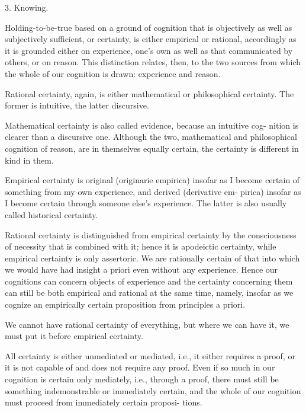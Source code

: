     3. Knowing.

    Holding-to-be-true based on a ground of cognition that is
    objectively as well as subjectively sufficient, or certainty, is
    either empirical or rational, accordingly as it is grounded either
    on experience, one's own as well as that communicated by others, or on reason.
    This distinction relates, then, to the two sources from which
    the whole of our cognition is drawn: experience and reason.

    Rational certainty, again, is either
    mathematical or philosophical certainty.
    The former is intuitive, the latter discursive.

    Mathematical certainty is also called evidence, because an intuitive cog-
    nition is clearer than a discursive one. Although the two, mathematical
    and philosophical cognition of reason, are in themselves equally certain,
    the certainty is different in kind in them.

    Empirical certainty is original (originarie empirica) insofar as I become
    certain of something from my own experience, and derived (derivative em-
    pirica) insofar as I become certain through someone else's experience. The
    latter is also usually called historical certainty.

    Rational certainty is distinguished from empirical certainty
    by the consciousness of necessity that is combined with it;
    hence it is apodeictic certainty,
    while empirical certainty is only assertoric.
    We are rationally certain of that
    into which we would have had insight a priori
    even without any experience.
    Hence our cognitions can concern objects of experience
    and the certainty concerning them can still be
    both empirical and rational at the same time, namely,
    insofar as we cognize an empirically certain proposition
    from principles a priori.

    We cannot have rational certainty of everything,
    but where we can have it,
    we must put it before empirical certainty.

    All certainty is either unmediated or mediated, i.e., it either requires a
    proof, or it is not capable of and does not require any proof. Even if so
    much in our cognition is certain only mediately, i.e., through a proof,
    there must still be something indemonstrable or immediately certain, and the
    whole of our cognition must proceed from immediately certain proposi-
    tions.

